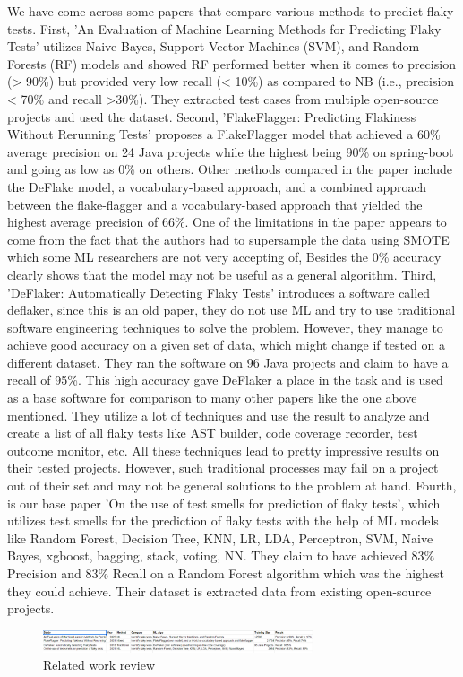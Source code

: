 \documentclass[sigconf,review]{acmart}
\begin{document}
We have come across some papers that compare various methods to predict flaky tests. First, 'An Evaluation of Machine Learning Methods for Predicting Flaky Tests'\cite{r1} utilizes Naive Bayes, Support Vector Machines (SVM), and Random Forests (RF) models and showed RF performed better when
it comes to precision (> 90\%) but provided very low recall (< 10\%) as compared to NB (i.e., precision < 70\% and recall >30\%). They extracted test cases from multiple open-source projects and used the dataset. Second, 'FlakeFlagger: Predicting Flakiness Without Rerunning Tests'\cite{r2} proposes a FlakeFlagger model that achieved a 60\% average precision on 24 Java projects while the highest being 90\% on spring-boot and going as low as 0\% on others. Other methods compared in the paper include the DeFlake model, a vocabulary-based approach, and a combined approach between the flake-flagger and a vocabulary-based approach that yielded the highest average precision of 66\%. One of the limitations in the paper appears to come from the fact that the authors had to supersample the data using SMOTE which some ML researchers are not very accepting of, Besides the 0\% accuracy clearly shows that the model may not be useful as a general algorithm. Third, 'DeFlaker: Automatically Detecting Flaky Tests'\cite{r3} introduces a software called deflaker, since this is an old paper, they do not use ML and try to use traditional software engineering techniques to solve the problem. However, they manage to achieve good accuracy on a given set of data, which might change if tested on a different dataset. They ran the software on 96 Java projects and claim to have a recall of 95\%. This high accuracy gave DeFlaker a place in the task and is used as a base software for comparison to many other papers like the one above mentioned. They utilize a lot of techniques and use the result to analyze and create a list of all flaky tests like AST builder, code coverage recorder, test outcome monitor, etc. All these techniques lead to pretty impressive results on their tested projects. However, such traditional processes may fail on a project out of their set and may not be general solutions to the problem at hand. Fourth, is our base paper 'On the use of test smells for prediction of flaky tests'\cite{r4}, which utilizes test smells for the prediction of flaky tests with the help of ML models like Random Forest, Decision Tree, KNN, LR, LDA, Perceptron, SVM, Naive Bayes, xgboost, bagging, stack, voting, NN. They claim to have achieved 83\% Precision and 83\% Recall on a Random Forest algorithm which was the highest they could achieve. Their dataset is extracted data from existing open-source projects.
  \begin{figure}
     \centering
     \includegraphics[width=8cm]{Screenshot 2023-04-10 205936.png}
     \caption{Related work review}
     \label{fig:relatedWork}
 \end{figure}
 
\end{document}
